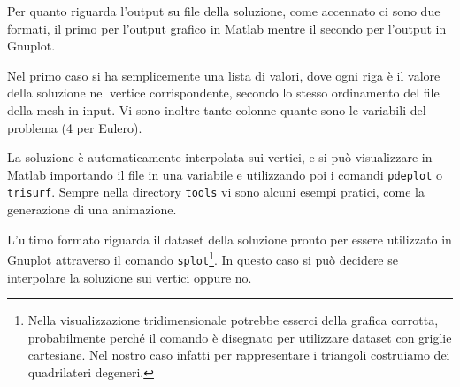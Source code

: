 Per quanto riguarda l'output su file della soluzione, come accennato ci sono due formati, il primo per l'output grafico in Matlab mentre il secondo per l'output in Gnuplot.

Nel primo caso si ha semplicemente una lista di valori, dove ogni riga è il valore della soluzione nel vertice corrispondente, secondo lo stesso ordinamento del file della mesh in input. Vi sono inoltre tante colonne quante sono le variabili del problema (4 per Eulero).

La soluzione è automaticamente interpolata sui vertici, e si può visualizzare in Matlab importando il file in una variabile e utilizzando poi i comandi \texttt{pdeplot} o \texttt{trisurf}. Sempre nella directory \texttt{tools} vi sono alcuni esempi pratici, come la generazione di una animazione.

L'ultimo formato riguarda il dataset della soluzione pronto per essere utilizzato in Gnuplot attraverso il comando \texttt{splot}\footnote{Nella visualizzazione tridimensionale potrebbe esserci della grafica corrotta, probabilmente perché il comando è disegnato per utilizzare dataset con griglie cartesiane. Nel nostro caso infatti per rappresentare i triangoli costruiamo dei quadrilateri degeneri.}. In questo caso si può decidere se interpolare la soluzione sui vertici oppure no.